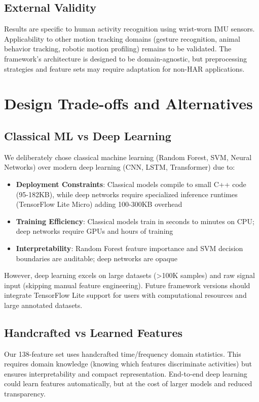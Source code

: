 \subsection{External Validity}
Results are specific to human activity recognition using wrist-worn IMU sensors. Applicability to other motion tracking domains (gesture recognition, animal behavior tracking, robotic motion profiling) remains to be validated. The framework's architecture is designed to be domain-agnostic, but preprocessing strategies and feature sets may require adaptation for non-HAR applications.

\section{Design Trade-offs and Alternatives}

\subsection{Classical ML vs Deep Learning}
We deliberately chose classical machine learning (Random Forest, SVM, Neural Networks) over modern deep learning (CNN, LSTM, Transformer) due to:
\begin{itemize}
    \item \textbf{Deployment Constraints}: Classical models compile to small C++ code (95-182KB), while deep networks require specialized inference runtimes (TensorFlow Lite Micro) adding 100-300KB overhead
    \item \textbf{Training Efficiency}: Classical models train in seconds to minutes on CPU; deep networks require GPUs and hours of training
    \item \textbf{Interpretability}: Random Forest feature importance and SVM decision boundaries are auditable; deep networks are opaque
\end{itemize}

However, deep learning excels on large datasets (>100K samples) and raw signal input (skipping manual feature engineering). Future framework versions should integrate TensorFlow Lite support for users with computational resources and large annotated datasets.

\subsection{Handcrafted vs Learned Features}
Our 138-feature set uses handcrafted time/frequency domain statistics. This requires domain knowledge (knowing which features discriminate activities) but ensures interpretability and compact representation. End-to-end deep learning could learn features automatically, but at the cost of larger models and reduced transparency.

